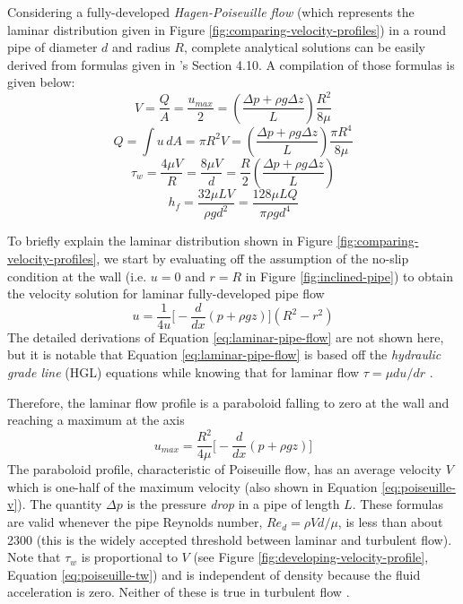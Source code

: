 \documentclass[11pt]{article} %
\numberwithin{equation}{section} %
\begin{document}
Considering a fully-developed \textit{Hagen-Poiseuille flow} (which represents the laminar distribution given in Figure \ref{fig:comparing-velocity-profiles}) in a round pipe of diameter $d$ and radius $R$, complete analytical solutions can be easily derived from formulas given in \textcite{fluid-mechanics}'s Section 4.10. A compilation of those formulas is given below:
\begin{equation} \label{eq:poiseuille-v}
V = \frac{Q}{A} = \frac{u_{max}}{2} = \left( \frac{\Delta p + \rho g \Delta z}{L} \right) \frac{R^{2}}{8 \mu}
\end{equation}
\begin{equation}
Q = \int u\, dA = \pi R^{2} V = \left( \frac{\Delta p + \rho g \Delta z}{L} \right) \frac{\pi R^{4}}{8 \mu}
\end{equation}
\begin{equation} \label{eq:poiseuille-tw}
\tau_{w} = \frac{4 \mu V}{R} = \frac{8 \mu V}{d} = \frac{R}{2} \left( \frac{\Delta p + \rho g \Delta z}{L} \right)
\end{equation}
\begin{equation}
h_{f} = \frac{32 \mu L V}{\rho g d^{2}} = \frac{128 \mu L Q}{\pi \rho g d^{4}}
\end{equation}


To briefly explain the laminar distribution shown in Figure \ref{fig:comparing-velocity-profiles}, we start by evaluating off the assumption of the no-slip condition at the wall (i.e. $u=0$ and $r=R$ in Figure \ref{fig:inclined-pipe}) to obtain the velocity solution for laminar fully-developed pipe flow
\begin{equation} \label{eq:laminar-pipe-flow}
u = \frac{1}{4 u} \big[ -\frac{d}{dx} (p + \rho g z) \big] (R^{2} - r^{2})
\end{equation}
The detailed derivations of Equation \ref{eq:laminar-pipe-flow} are not shown here, but it is notable that Equation \ref{eq:laminar-pipe-flow} is based off the \textit{hydraulic grade line} (HGL) equations while knowing that for laminar flow $\tau = \mu du/dr$ \cite{fluid-mechanics}.

Therefore, the laminar flow profile is a paraboloid falling to zero at the wall and reaching a maximum at the axis
\begin{equation}
u_{max} = \frac{R^{2}}{4 \mu} \big[  -\frac{d}{dx} (p + \rho g z) \big]
\end{equation}
The paraboloid profile, characteristic of Poiseuille flow, has an average velocity $V$ which is one-half of the maximum velocity (also shown in Equation \ref{eq:poiseuille-v}). The quantity $\Delta p$ is the pressure \textit{drop} in a pipe of length $L$. These formulas are valid whenever the pipe Reynolds number, $Re_{d} = \rho V d/\mu$, is less than about 2300 (this is the widely accepted threshold between laminar and turbulent flow). Note that $\tau_{w}$ is proportional to $V$ (see Figure \ref{fig:developing-velocity-profile}, Equation \ref{eq:poiseuille-tw}) and is independent of density because the fluid acceleration is zero. Neither of these is true in turbulent flow \cite{fluid-mechanics}.
\end{document}
